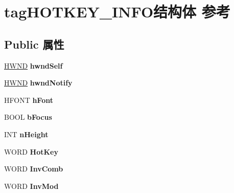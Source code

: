 \hypertarget{structtag_h_o_t_k_e_y___i_n_f_o}{}\section{tag\+H\+O\+T\+K\+E\+Y\+\_\+\+I\+N\+F\+O结构体 参考}
\label{structtag_h_o_t_k_e_y___i_n_f_o}
\subsection*{Public 属性}
\begin{DoxyCompactItemize}
\item 
\mbox{\label{structtag_h_o_t_k_e_y___i_n_f_o_acd474fb21e145b1468fb08feb3fc06e0}} 
\hyperlink{interfacevoid}{H\+W\+ND} {\bfseries hwnd\+Self}
\item 
\mbox{\label{structtag_h_o_t_k_e_y___i_n_f_o_acc70f387d438d31a65a048ffef6f79c2}} 
\hyperlink{interfacevoid}{H\+W\+ND} {\bfseries hwnd\+Notify}
\item 
\mbox{\label{structtag_h_o_t_k_e_y___i_n_f_o_a6db28fa3d98b2017750cac0f2187dc42}} 
H\+F\+O\+NT {\bfseries h\+Font}
\item 
\mbox{\label{structtag_h_o_t_k_e_y___i_n_f_o_ae188183c082a3b3d258f7aadd65073f7}} 
B\+O\+OL {\bfseries b\+Focus}
\item 
\mbox{\label{structtag_h_o_t_k_e_y___i_n_f_o_a17e92ce179a6f5e74fda72cf976d0964}} 
I\+NT {\bfseries n\+Height}
\item 
\mbox{\label{structtag_h_o_t_k_e_y___i_n_f_o_a105e49e48b0ccb57ce1433cb680b072a}} 
W\+O\+RD {\bfseries Hot\+Key}
\item 
\mbox{\label{structtag_h_o_t_k_e_y___i_n_f_o_adaa74e5304ee1962815e5f68c98ea948}} 
W\+O\+RD {\bfseries Inv\+Comb}
\item 
\mbox{\label{structtag_h_o_t_k_e_y___i_n_f_o_a0e86589647852d9faffed27ab202fae1}} 
W\+O\+RD {\bfseries Inv\+Mod}

\end{DoxyCompactItemize}
